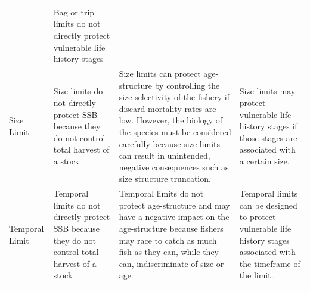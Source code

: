 \documentclass[]{book}
\begin{document}
\begin{longtable}[]{@{}llll@{}}
\begin{minipage}[t]{0.22\columnwidth}
\end{minipage} & \begin{minipage}[t]{0.22\columnwidth}\raggedright\strut
Bag or trip limits do not directly protect vulnerable life history
stages\strut
\end{minipage}\tabularnewline
\begin{minipage}[t]{0.22\columnwidth}\raggedright\strut
Size Limit\strut
\end{minipage} & \begin{minipage}[t]{0.22\columnwidth}\raggedright\strut
Size limits do not directly protect SSB because they do not control
total harvest of a stock\strut
\end{minipage} & \begin{minipage}[t]{0.22\columnwidth}\raggedright\strut
Size limits can protect age-structure by controlling the size
selectivity of the fishery if discard mortality rates are low. However,
the biology of the species must be considered carefully because size
limits can result in unintended, negative consequences such as size
structure truncation.\strut
\end{minipage} & \begin{minipage}[t]{0.22\columnwidth}\raggedright\strut
Size limits may protect vulnerable life history stages if those stages
are associated with a certain size.\strut
\end{minipage}\tabularnewline
\begin{minipage}[t]{0.22\columnwidth}\raggedright\strut
Temporal Limit\strut
\end{minipage} & \begin{minipage}[t]{0.22\columnwidth}\raggedright\strut
Temporal limits do not directly protect SSB because they do not control
total harvest of a stock\strut
\end{minipage} & \begin{minipage}[t]{0.22\columnwidth}\raggedright\strut
Temporal limits do not protect age-structure and may have a negative
impact on the age-structure because fishers may race to catch as much
fish as they can, while they can, indiscriminate of size or age.\strut
\end{minipage} & \begin{minipage}[t]{0.22\columnwidth}\raggedright\strut
Temporal limits can be designed to protect vulnerable life history
stages associated with the timeframe of the limit.\strut
\end{minipage}\tabularnewline
\begin{minipage}[t]{0.22\columnwidth}\raggedright\strut

\end{minipage}
\end{longtable}
\end{document}
